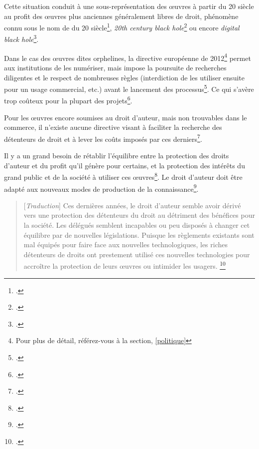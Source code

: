 Cette situation conduit à une sous-représentation des \oe{}uvres à partir du 20 siècle au profit des \oe{}uvres plus anciennes généralement libres de droit, phénomène connu sous le nom de  du 20 siècle\footcite{dufrene_numerisation_2013}, \textit{20th century black hole}\footcite{noauthor_european_2019} ou encore \textit{digital black hole}\footcite{association_pour_le_patrimoine_naturel_et_culturel_du_canton_de_vaud_patrimoine_2012}.

Dans le cas des \oe{}uvres dites orphelines, la directive européenne de 2012\footnote{Pour plus de détail, référez-vous à la section, \ref{politique}} permet aux institutions de les numériser, mais impose la poursuite de recherches diligentes et le respect de nombreuses règles (interdiction de les utiliser ensuite pour un usage commercial, etc.) avant le lancement des processus\footcite{stobo_i_2018}. Ce qui s'avère trop coûteux pour la plupart des projets\footcite{noauthor_european_2019}.

Pour les \oe{}uvres encore soumises au droit d'auteur, mais non trouvables dans le commerce, il n'existe aucune directive visant à faciliter la recherche des détenteurs de droit et à lever les coûts imposés par ces derniers\footcite{noauthor_european_2019}.

Il y a un grand besoin de rétablir l'équilibre entre la protection des droits d'auteur et du profit qu'il génère pour certains, et la protection des intérêts du grand public et de la société à utiliser ces \oe{}uvres\footcite{pavlovic_serpent_2011}. Le droit d'auteur doit être adapté aux nouveaux modes de production de la connaissance\footcite{dufrene_numerisation_2013}. 

\begin{quotation} 
[\textit{Traduction}]
Ces dernières années, le droit d'auteur semble avoir dérivé vers une protection des détenteurs du droit au détriment des bénéfices pour la société. Les délégués semblent incapables ou peu disposés à changer cet équilibre par de nouvelles législations. Puisque les règlements existants sont mal équipés pour faire face aux nouvelles technologiques, les riches détenteurs de droits ont prestement utilisé ces nouvelles technologies pour accroître la protection de leurs \oe{}uvres ou intimider les usagers. \footnote{\cite[p.54]{xie_discover_2016}.}
\end{quotation}

